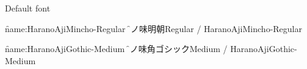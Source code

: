

\nopagenumbers

Default font

\font\f{name:HaranoAjiMincho-Regular} \f
原ノ味明朝Regular / HaranoAjiMincho-Regular

\font\f{name:HaranoAjiGothic-Medium} \f
原ノ味角ゴシックMedium / HaranoAjiGothic-Medium

\bye
